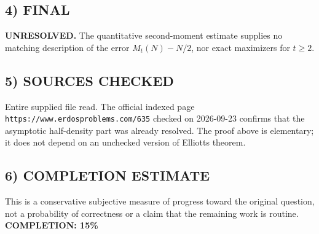 \subsection{4) FINAL}
\textbf{UNRESOLVED.}
The quantitative second-moment estimate supplies no matching description of the error $M_t(N)-N/2$, nor exact maximizers for $t\ge2$.
\subsection{5) SOURCES CHECKED}
Entire supplied file read. The official indexed page \texttt{https://www.erdosproblems.com/635} checked on 2026-09-23 confirms that the asymptotic half-density part was already resolved. The proof above is elementary; it does not depend on an unchecked version of Elliott\textquotesingle s theorem.
\subsection{6) COMPLETION ESTIMATE}
This is a conservative subjective measure of progress toward the original question, not a probability of correctness or a claim that the remaining work is routine.
\textbf{COMPLETION: 15\%}
